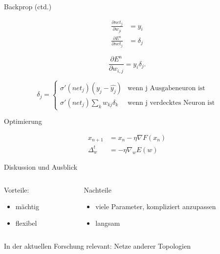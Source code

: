 \documentclass[10pt, compress, xetex]{beamer}
\begin{document}
\begin{frame}{Backprop (ctd.)}


\begin{align}
  \frac{\partial net_j }{\partial w_{ji}} & =  y_i
  \\
  \frac{\partial E^n}{\partial net_j} & =  \delta_j
\end{align}

\begin{equation}
\label{eq:evaluate}
  \frac{\partial E^n}{\partial w_{i,j}} = y_i  \delta_j.
\end{equation}

\begin{equation}
\label{eq:backpropagation}
\delta_j =  \begin{cases}
               \sigma ' (net_j) (y_j - \hat{y_j})           & \text{wenn j Ausgabeneuron ist}\\
               \sigma ' (net_j) \sum_k w_{kj} \delta_k     & \text{wenn j verdecktes Neuron ist}
           \end{cases} 
\end{equation} 
\end{frame}
\begin{frame}{Optimierung}

\begin{align}
x_{n+1} &=x_n- \eta  \nabla F(x_n) \\
\Delta_w^t &= - \eta  \nabla_w E(w)
\end{align}

\end{frame}

\begin{frame}{Diskussion und Ausblick}
\begin{columns}[T]
  \begin{column}[T]{.5\textwidth}
        Vorteile:
        \begin{itemize}
          \item mächtig
          \item flexibel
        \end{itemize}
  \end{column}  
  \begin{column}[T]{.5\textwidth}
        Nachteile
        \begin{itemize}
          \item viele Parameter, kompliziert anzupassen
          \item langsam
        \end{itemize}
    \end{column}
\end{columns} 
In der \alert{aktuellen} Forschung relevant: Netze anderer Topologien 
\end{frame}
\end{document}
